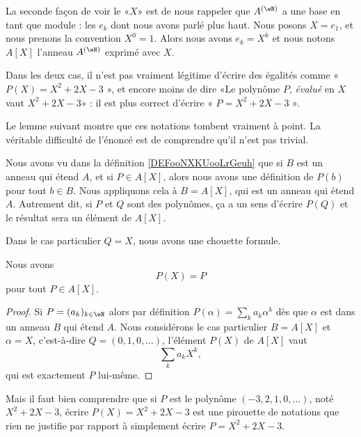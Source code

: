 \begin{normaltext}      \label{NORMooHHIVooSfHlxv}
	La seconde façon de voir le «\( X\)» est de nous rappeler que \( A^{(\eN)}\) a une base en tant que module : les \( e_k\) dont nous avons parlé plus haut. Nous posons \( X=e_1\), et nous prenons la convention \( X^0=1\). Alors nous avons \( e_k=X^k\) et nous notons \( A[X]\) l'anneau \(A^{(\eN)}\) exprimé avec \( X\).

	Dans les deux cas, il n'est pas vraiment légitime d'écrire des égalités comme « \( P(X)=X^2+2X-3\) », et encore moins de dire «Le polynôme \( P\), \emph{évalué} en \( X\) vaut \( X^2+2X-3\)»  : il est plus correct d'écrire « \( P=X^2+2X-3\) ».

	Le lemme suivant montre que ces notations tombent vraiment à point. La véritable difficulté de l'énoncé est de comprendre qu'il n'est pas trivial.

	Nous avons vu dans la définition \ref{DEFooNXKUooLrGeuh} que si \( B\) est un anneau qui étend \( A\), et si \(P\in A[X] \), alors nous avons une définition de \( P(b)\) pour tout \( b\in B\). Nous appliquons cela à \( B=A[X]\), qui est un anneau qui étend \( A\). Autrement dit, si \( P\) et \( Q\) sont des polynômes, ça a un sens d'écrire \( P(Q)\) et le résultat sera un élément de \( A[X]\).
\end{normaltext}

Dans le cas particulier \( Q=X\), nous avons une chouette formule.
\begin{lemma}       \label{LEMooGKWQooVOyeDX}
	Nous avons
	\begin{equation}
		P(X)=P
	\end{equation}
	pour tout \( P\in A[X]\).
\end{lemma}

\begin{proof}
	Si \( P=(a_k)_{k\in \eN}\) alors par définition \( P(\alpha)=\sum_ka_k\alpha^k\) dès que \( \alpha\) est dans un anneau \( B\) qui étend \( A\). Nous considérons le cas particulier \( B=A[X]\) et \( \alpha=X\), c'est-à-dire \( Q=(0,1,0,\ldots)\), l'élément \( P(X)\) de \( A[X]\) vaut
	\begin{equation}        \label{EQooABULooFCEasf}
		\sum_ka_kX^k,
	\end{equation}
	qui est exactement \( P\) lui-même.
\end{proof}

Mais il faut bien comprendre que si \( P\) est le polynôme \( (-3,2,1,0,\ldots)\), noté \( X^2+2X-3\), écrire \( P(X)=X^2+2X-3\) est une pirouette de notations que rien ne justifie par rapport à simplement écrire \( P=X^2+2X-3\).




